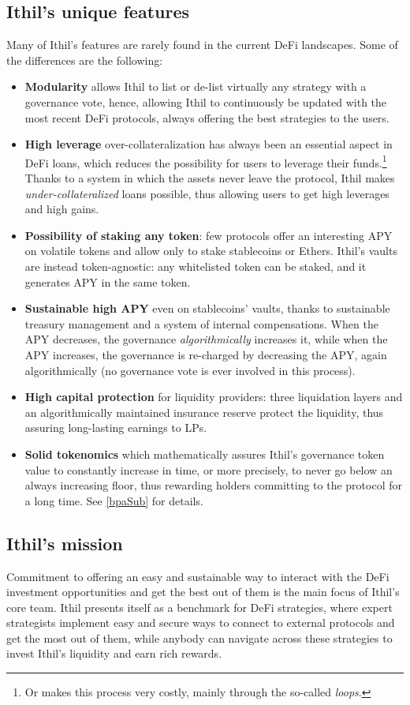 \documentclass[a4paper,10 pt]{article}
\theoremstyle{definition}
\begin{document}
\subsection{Ithil's unique features}
Many of Ithil's features are rarely found in the current DeFi landscapes. Some of the differences are the following:
\begin{itemize}
\item {\bf Modularity} allows Ithil to list or de-list virtually any strategy with a governance vote, hence, allowing Ithil to continuously be updated with the most recent DeFi protocols, always offering the best strategies to the users.
\item {\bf High leverage} over-collateralization has always been an essential aspect in DeFi loans, which reduces the possibility for users to leverage their funds.\footnote{Or makes this process very costly, mainly through the so-called {\it loops}.} Thanks to a system in which the assets never leave the protocol, Ithil makes {\it under-collateralized} loans possible, thus allowing users to get high leverages and high gains.
\item {\bf Possibility of staking any token}: few protocols offer an interesting APY on volatile tokens and allow only to stake stablecoins or Ethers. Ithil's vaults are instead token-agnostic: any whitelisted token can be staked, and it generates APY in the same token.
\item {\bf Sustainable high APY} even on stablecoins' vaults, thanks to sustainable treasury management and a system of internal compensations. When the APY decreases, the governance {\it algorithmically} increases it, while when the APY increases, the governance is re-charged by decreasing the APY, again algorithmically (no governance vote is ever involved in this process).
\item {\bf High capital protection} for liquidity providers: three liquidation layers and an algorithmically maintained insurance reserve protect the liquidity, thus assuring long-lasting earnings to LPs.
\item {\bf Solid tokenomics} which mathematically assures Ithil's governance token value to constantly increase in time, or more precisely, to never go below an always increasing floor, thus rewarding holders committing to the protocol for a long time. See \ref{bpaSub} for details. 
\end{itemize}

\subsection{Ithil's mission}
Commitment to offering an easy and sustainable way to interact with the DeFi investment opportunities and get the best out of them is the main focus of Ithil's core team. Ithil presents itself as a benchmark for DeFi strategies, where expert strategists implement easy and secure ways to connect to external protocols and get the most out of them, while anybody can navigate across these strategies to invest Ithil's liquidity and earn rich rewards.
\end{document}
